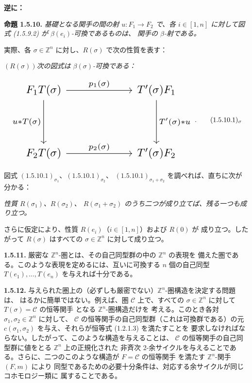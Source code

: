 \clearpage
{}%
\noindent\textbf{逆に：}\par

\noindent\textbf{命題 1.5.10.}\quad
\emph{基礎となる関手の間の射 $u\colon F_1\to F_2$ で、各
$i\in[1,n]$ に対して図式 (1.5.9.2) が $\beta(e_i)$-可換であるものは、
関手の $\beta$-射である。}

実際、各 $\sigma\in\mathbb Z^n$ に対し、$R(\sigma)$ で次の性質を表す：

\noindent\emph{$(R(\sigma))$\qquad 次の図式は $\beta(\sigma)$-可換である：}

\begin{equation}
  \resizebox{0.78\textwidth}{!}{%
    $\begin{tikzcd}[ampersand replacement=\&,column sep=6em,row sep=4em]
      F_1T(\sigma)
        \arrow[r,"{p_1(\sigma)}"]
        \arrow[d,"{u*T(\sigma)}"']
        \& T'(\sigma)F_1
          \arrow[d,"{T'(\sigma)*u}"] \\
      F_2T(\sigma)
        \arrow[r,"{p_2(\sigma)}"]
        \& T'(\sigma)F_2
    \end{tikzcd}$%
  }\;.
  \tag*{\ensuremath{(1.5.10.1)_{\sigma}}}
\end{equation}

図式 $(1.5.10.1)_{\sigma_1}$、$(1.5.10.1)_{\sigma_2}$、
$(1.5.10.1)_{\sigma_1+\sigma_2}$ を調べれば、直ちに次が分かる：

\noindent\emph{性質 $R(\sigma_1)$、$R(\sigma_2)$、
$R(\sigma_1+\sigma_2)$ のうち二つが成り立てば、残る一つも成り立つ。}

さらに仮定により、性質 $R(e_i)$（$i\in[1,n]$）および $R(0)$ が
成り立つ。したがって $R(\sigma)$ はすべての
$\sigma\in\mathbb Z^n$ に対して成り立つ。

\noindent\textbf{1.5.11.}\quad
厳密な $\mathbb Z^n$-圏とは、その自己同型群の中の $\mathbb Z^n$ の表現を
備えた圏である。このような表現を定めるには、互いに可換する $n$ 個の自己同型
$T(e_1),\ldots,T(e_n)$ を与えれば十分である。

\noindent\textbf{1.5.12.}\quad
与えられた圏上の（必ずしも厳密でない）$\mathbb Z^n$-圏構造を決定する問題は、
はるかに簡単ではない。例えば、圏 $\mathcal C$ 上で、すべての
$\sigma\in\mathbb Z^n$ に対して
$T(\sigma)=\text{$\mathcal C$ の恒等関手}$ となる $\mathbb Z^n$-圏構造だけを
考える。このとき各対 $\sigma_1,\sigma_2\in\mathbb Z^n$ に対して、
$\mathcal C$ の恒等関手の自己同型群（これは可換群である）の元
$c(\sigma_1,\sigma_2)$ を与え、それらが恒等式 (1.2.1.3) を満たすことを
要求しなければならない。したがって、このような構造を与えることは、
$\mathcal C$ の恒等関手の自己同型群に値をとる $\mathbb Z^n$ 上の正規化された
非斉次 2-余サイクルを与えることである。さらに、二つのこのような構造が
$F=\text{$\mathcal C$ の恒等関手}$ を満たす $\mathbb Z^n$-関手 $(F,m)$ により
同型であるための必要十分条件は、対応する余サイクルが同じコホモロジー類に
属することである。
